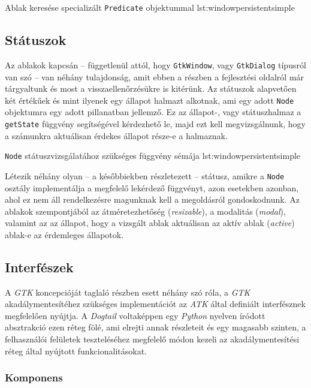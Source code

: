 {Ablak keresése specializált \texttt{Predicate} objektummal}
{lst:windowpersistentsimple}

\subsection{Státuszok}

Az ablakok kapcsán -- függetlenül attól, hogy \texttt{GtkWindow}, vagy \texttt{GtkDialog} típusról van szó -- van néhány tulajdonság, amit ebben a részben a fejlesztési oldalról már tárgyaltunk és most a visszaellenőrzésükre is kitérünk. Az státuszok alapvetően két értékűek és mint ilyenek egy állapot halmazt alkotnak, ami egy adott \texttt{Node} objektumra egy adott pillanatban jellemző. Ez az állapot-, vagy státuszhalmaz a \texttt{getState} függvény segítségével kérdezhető le, majd ezt kell megvizsgálnunk, hogy a számunkra aktuálisan érdekes állapot része-e a halmaznak.

{\texttt{Node} státuszvizsgálatához szükséges függvény sémája}
{lst:windowpersistentsimple}

Létezik néhány olyan -- a későbbiekben részletezett -- státusz, amikre a \texttt{Node} osztály implementálja a megfelelő lekérdező függvényt, azon esetekben azonban, ahol ez nem áll rendelkezésre magunknak kell a megoldásról gondoskodnunk. Az ablakok szempontjából az átméretezhetőség (\textit{resizable}), a modalitás (\textit{modal}), valamint az az állapot, hogy a vizsgált ablak aktuálisan az aktív ablak (\textit{active}) ablak-e az érdemleges állapotok.

\subsection{Interfészek}

A \textit{GTK} koncepcióját taglaló részben esett néhány szó róla, a \textit{GTK} akadálymentesítéhez szükséges implementációt az \textit{ATK} által definiált interfésznek megfelelően nyújtja. A \textit{Dogtail} voltaképpen egy \textit{Python} nyelven íródott absztrakció ezen réteg fölé, ami elrejti annak részleteit és egy magasabb szinten, a felhasználói felületek teszteléséhez megfelelő módon kezeli az akadálymentesítési réteg által nyújtott funkcionalitásokat.

\subsubsection{Komponens}

